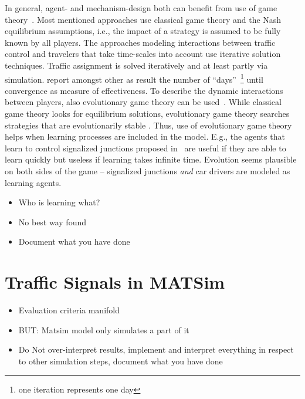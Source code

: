 
In general, agent- and mechanism-design both can benefit from use of game theory~\citep[][pp.~666]{RusselNorvig2010ArtificialIntelligence}. 
Most mentioned approaches use classical game theory and the Nash equilibrium assumptions, i.e., the impact of a strategy is assumed to be fully known by all players. 
The approaches modeling interactions between traffic control and travelers that take time-scales into account use iterative solution techniques. 
Traffic assignment is solved iteratively and at least partly via simulation. 
\citet{Hu1997D2DFlowEvolutionReactiveSignalsDynasmart} report amongst other as result the number of ``days''~\footnote{one iteration represents one day} until convergence as measure of effectiveness. 
To describe the dynamic interactions between players, also evolutionary game theory can be used~\citep[e.g.~][]{HofbSigmBook}. 
While classical game theory looks for equilibrium solutions, evolutionary game theory searches strategies that are evolutionarily stable \citep[p.~348]{Bazzan2009ReinforcementLearningPrint}. 
Thus, use of evolutionary game theory helps when learning processes are included in the model. 
E.g., the agents that learn to control signalized junctions proposed in~\citet{Bazzan2005signalAgents} are useful if they are able to learn quickly but useless if learning takes infinite time. 
Evolution seems plausible on both sides of the game -- \citet[e.g.~][]{BazzanEtc2008co-evolution-of-tr-lights-lncs} signalized junctions \emph{and} car drivers are modeled as learning agents. 

\begin{itemize}
	\item Who is learning what? 
	\item No best way found
	\item Document what you have done
\end{itemize}


\section{Traffic Signals in MATSim}
\label{sec:signals_evaluation_conclusion}

\begin{itemize}
	\item Evaluation criteria manifold
	\item BUT: Matsim model only simulates a part of it
	\item Do Not over-interpret results, implement and interpret everything in respect to other simulation steps, document what you have done
\end{itemize}


